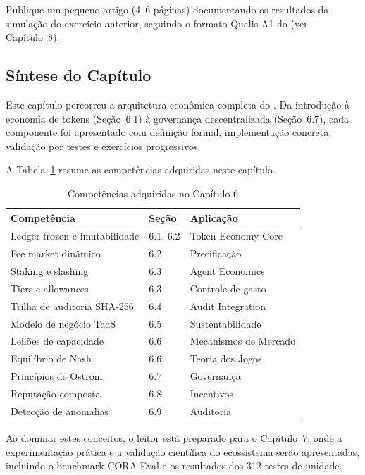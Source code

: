 \begin{exercicio}
Publique um pequeno artigo (4--6 páginas) documentando os
resultados da simulação do exercício anterior, seguindo o
formato Qualis A1 do \opencodeeco{} (ver Capítulo~8).
\end{exercicio}

\subsection{Síntese do Capítulo}

Este capítulo percorreu a arquitetura econômica completa do
\opencodeeco{}. Da introdução à economia de tokens (Seção~6.1)
à governança descentralizada (Seção~6.7), cada componente foi
apresentado com definição formal, implementação concreta,
validação por testes e exercícios progressivos.

A Tabela~\ref{tab:competencias-cap6} resume as competências
adquiridas neste capítulo.

\begin{table}[htb]
\centering
\caption{Competências adquiridas no Capítulo 6}
\label{tab:competencias-cap6}
\begin{tabular}{lll}
\toprule
\textbf{Competência} & \textbf{Seção} & \textbf{Aplicação} \\
\midrule
Ledger frozen e imutabilidade & 6.1, 6.2 & Token Economy Core \\
Fee market dinâmico & 6.2 & Precificação \\
Staking e slashing & 6.3 & Agent Economics \\
Tiers e allowances & 6.3 & Controle de gasto \\
Trilha de auditoria SHA-256 & 6.4 & Audit Integration \\
Modelo de negócio TaaS & 6.5 & Sustentabilidade \\
Leilões de capacidade & 6.6 & Mecanismos de Mercado \\
Equilíbrio de Nash & 6.6 & Teoria dos Jogos \\
Princípios de Ostrom & 6.7 & Governança \\
Reputação composta & 6.8 & Incentivos \\
Detecção de anomalias & 6.9 & Auditoria \\
\bottomrule
\end{tabular}
\end{table}

Ao dominar estes conceitos, o leitor está preparado para o
Capítulo~7, onde a experimentação prática e a validação
científica do ecossistema serão apresentadas, incluindo o
benchmark CORA-Eval e os resultados dos 312 testes de unidade.

